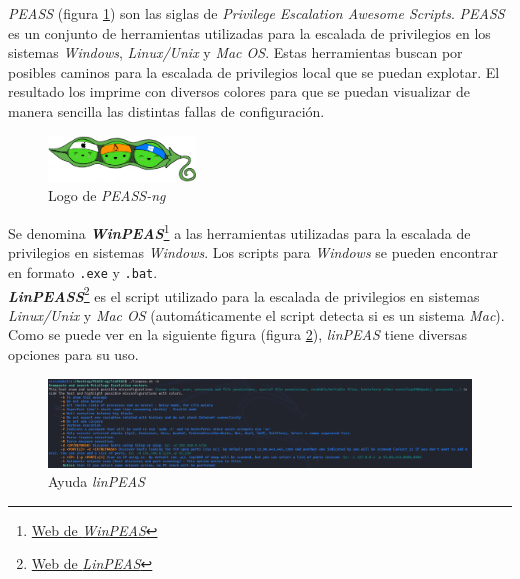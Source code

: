 \textit{PEASS}\cite{peas} (figura \ref{fig:peass-logo}) son las siglas de \textit{Privilege Escalation Awesome Scripts}. \textit{PEASS} es un conjunto de herramientas utilizadas para la escalada de privilegios en los sistemas \textit{Windows}, \textit{Linux/Unix} y \textit{Mac OS}. Estas herramientas buscan por posibles caminos para la escalada de privilegios local que se puedan explotar. El resultado los imprime con diversos colores para que se puedan visualizar de manera sencilla las distintas fallas de configuración.\\

\begin{figure}[h]
    \centering
    \includegraphics[width=0.35\textwidth]{images/sections/tools/peass.png}
    \caption{Logo de \textit{PEASS-ng}}
    \label{fig:peass-logo}
\end{figure}

Se denomina \textit{\textbf{WinPEAS}}\footnote{\href{https://github.com/carlospolop/PEASS-ng/tree/master/winPEAS}{Web de \textit{WinPEAS}}} a las herramientas utilizadas para la escalada de privilegios en sistemas \textit{Windows}. Los scripts para \textit{Windows} se pueden encontrar en formato \texttt{.exe} y \texttt{.bat}.\\

\textit{\textbf{LinPEASS}}\footnote{\href{https://github.com/carlospolop/PEASS-ng/tree/master/linPEAS}{Web de \textit{LinPEAS}}} es el script utilizado para la escalada de privilegios en sistemas \textit{Linux/Unix} y \textit{Mac OS} (automáticamente el script detecta si es un sistema \textit{Mac}). Como se puede ver en la siguiente figura (figura \ref{fig:linpeas-help}), \textit{linPEAS} tiene diversas opciones para su uso.

\begin{figure}[h]
    \centering
    \includegraphics[width=1.0\textwidth]{images/sections/tools/linpeas-help.png}
    \caption{Ayuda \textit{linPEAS}}
    \label{fig:linpeas-help}
\end{figure}

